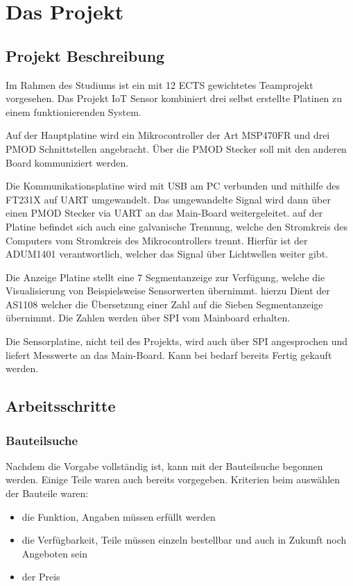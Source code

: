 %
\chapter{Das Projekt}
\label{chap:beschreibung}

\section{Projekt Beschreibung}
Im Rahmen des Studiums ist ein mit 12 ECTS gewichtetes Teamprojekt vorgesehen.
Das Projekt IoT Sensor kombiniert drei selbst erstellte Platinen zu einem funktionierenden System.

Auf der Hauptplatine wird ein Mikrocontroller der Art MSP470FR und drei PMOD Schnittstellen angebracht. Über die PMOD Stecker soll mit den anderen Board kommuniziert werden.

Die Kommunikationsplatine wird mit USB am PC verbunden und mithilfe des FT231X auf UART umgewandelt. Das umgewandelte Signal wird dann über einen PMOD Stecker via UART an das Main-Board weitergeleitet. auf der Platine befindet sich auch eine galvanische Trennung, welche den Stromkreis des Computers vom Stromkreis des Mikrocontrollers trennt. Hierfür ist der ADUM1401 verantwortlich, welcher das Signal über Lichtwellen weiter gibt.

Die Anzeige Platine stellt eine 7 Segmentanzeige zur Verfügung, welche die Visualisierung von Beispielsweise Sensorwerten übernimmt. hierzu Dient der AS1108 welcher die Übersetzung einer Zahl auf die Sieben Segmentanzeige übernimmt. Die Zahlen werden über SPI vom Mainboard erhalten.

Die Sensorplatine, nicht teil des Projekts, wird auch über SPI angesprochen und liefert Messwerte an das Main-Board. Kann bei bedarf  bereits Fertig gekauft werden.

\section{Arbeitsschritte}

\subsection{Bauteilsuche}
Nachdem die Vorgabe vollständig ist, kann mit der Bauteilsuche begonnen werden. Einige Teile waren auch bereits vorgegeben. Kriterien beim auswählen der Bauteile waren:

\begin{itemize}
	\item die Funktion, Angaben müssen erfüllt werden
	\item die Verfügbarkeit, Teile müssen einzeln bestellbar und auch in Zukunft noch Angeboten sein
	\item der Preis
\end{itemize}

